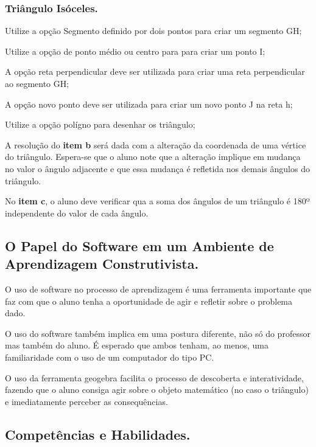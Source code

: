 \documentclass[a4paper,12pt]{article}
\begin{document}
\subsubsection{Triângulo Isóceles.}

\begin{list}{) }{}
\item Utilize a opção Segmento definido por dois pontos para criar um segmento GH;
\item Utilize a opção de ponto médio ou centro para para criar um ponto I;
\item A opção reta perpendicular deve ser utilizada para criar uma reta perpendicular ao segmento GH;
\item A opção novo ponto deve ser utilizada para criar um novo ponto J na reta h;
\item Utilize a opção polígno para desenhar os triângulo;
\end{list}


A resolução do \textbf{item b} será dada com a alteração da coordenada de uma vértice do triângulo. Espera-se que o aluno note que a alteração implique em mudança no valor o ângulo adjacente e que essa mudança é refletida nos demais ângulos do triângulo.

No \textbf{item c}, o aluno deve verificar qua a soma dos ângulos de um triângulo é 180º independente do valor de cada ângulo.

\subsection{O Papel do Software em um Ambiente de Aprendizagem Construtivista.}

O uso de software no processo de aprendizagem é uma ferramenta importante que faz com que o aluno tenha a oportunidade de agir e refletir sobre o problema dado.

O uso do software também implica em uma postura diferente, não só do professor mas também do aluno. É esperado que ambos tenham, ao menos, uma familiaridade com o uso de um computador do tipo PC.

O uso da ferramenta geogebra facilita o processo de descoberta e interatividade, fazendo que o aluno consiga agir sobre o objeto matemático (no caso o triângulo) e imediatamente perceber as consequências.

\subsection{Competências e Habilidades.}
\end{document}
